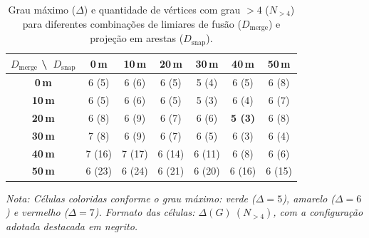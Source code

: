 \documentclass[cic,tc]{infufrgs}
\begin{document}
\begin{table}[H]
    \centering
    \caption{Grau máximo ($\Delta$) e quantidade de vértices com grau $> 4$ ($N_{>4}$) para diferentes combinações de limiares de fusão ($D_{\text{merge}}$) e projeção em arestas ($D_{\text{snap}}$).}
    \label{tab:grid_thresholds}
    \begin{tabular}{ccccccc}
        \toprule
        \textbf{$D_{\text{merge}}$ \textbackslash\ $D_{\text{snap}}$} & \textbf{0\,m} & \textbf{10\,m} & \textbf{20\,m} & \textbf{30\,m} & \textbf{40\,m} & \textbf{50\,m} \\
        \midrule
        \textbf{0\,m}  & \cellcolor{yellow!25} 6 (5)  & \cellcolor{yellow!25} 6 (6)  & \cellcolor{yellow!25} 6 (5)  & \cellcolor{green!25} 5 (4)  & \cellcolor{yellow!25} 6 (5)  & \cellcolor{yellow!25} 6 (8)  \\
        \textbf{10\,m} & \cellcolor{yellow!25} 6 (5)  & \cellcolor{yellow!25} 6 (6)  & \cellcolor{yellow!25} 6 (5)  & \cellcolor{green!25} 5 (3)  & \cellcolor{yellow!25} 6 (4)  & \cellcolor{yellow!25} 6 (7)  \\
        \textbf{20\,m} & \cellcolor{yellow!25} 6 (8)  & \cellcolor{yellow!25} 6 (9)  & \cellcolor{yellow!25} 6 (7)  & \cellcolor{yellow!25} 6 (6)  & \cellcolor{green!25} \textbf{5 (3)} & \cellcolor{yellow!25} 6 (8)  \\
        \textbf{30\,m} & \cellcolor{red!25} 7 (8)     & \cellcolor{yellow!25} 6 (9)  & \cellcolor{yellow!25} 6 (7)  & \cellcolor{yellow!25} 6 (5)  & \cellcolor{yellow!25} 6 (3)  & \cellcolor{yellow!25} 6 (4)  \\
        \textbf{40\,m} & \cellcolor{red!25} 7 (16)    & \cellcolor{red!25} 7 (17)    & \cellcolor{yellow!25} 6 (14) & \cellcolor{yellow!25} 6 (11) & \cellcolor{yellow!25} 6 (8)  & \cellcolor{yellow!25} 6 (6)  \\
        \textbf{50\,m} & \cellcolor{yellow!25} 6 (23) & \cellcolor{yellow!25} 6 (24) & \cellcolor{yellow!25} 6 (21) & \cellcolor{yellow!25} 6 (20) & \cellcolor{yellow!25} 6 (16) & \cellcolor{yellow!25} 6 (15) \\
        \bottomrule
    \end{tabular}
    \vspace{0.15cm}
    \par\raggedright\footnotesize\textit{Nota: Células coloridas conforme o grau máximo: verde ($\Delta = 5$), amarelo ($\Delta = 6$) e vermelho ($\Delta = 7$). Formato das células: $\Delta(G) \ (N_{>4})$, com a configuração adotada destacada em negrito.}
\end{table}
\end{document}
